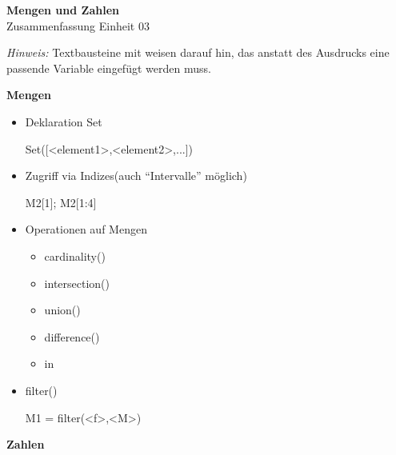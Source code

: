 \documentclass[a4paper,9pt,DIV15,twocolumn]{scrartcl}
\begin{document}
\begin{center}
    \textbf{\LARGE Mengen und Zahlen}\\
    {\large Zusammenfassung Einheit 03}
\end{center}
\textsl{Hinweis:} Textbausteine mit  weisen darauf hin, das anstatt des Ausdrucks eine passende Variable eingefügt werden muss.

\medskip

\textbf{Mengen}

\begin{itemize}
 \item Deklaration Set
\begin{sagein}
Set([<element1>,<element2>,...])
\end{sagein}
 \item Zugriff via Indizes(auch ``Intervalle'' möglich)
\begin{sagein}
M2[1]; M2[1:4]
\end{sagein}
 \item Operationen auf Mengen
\begin{itemize}
 \item cardinality()
 \item intersection()
 \item union()
 \item difference()
 \item in
 \end{itemize}
 \item filter()
\begin{sagein}
M1 = filter(<f>,<M>)
\end{sagein}
\end{itemize}


\textbf{Zahlen}
\end{document}
